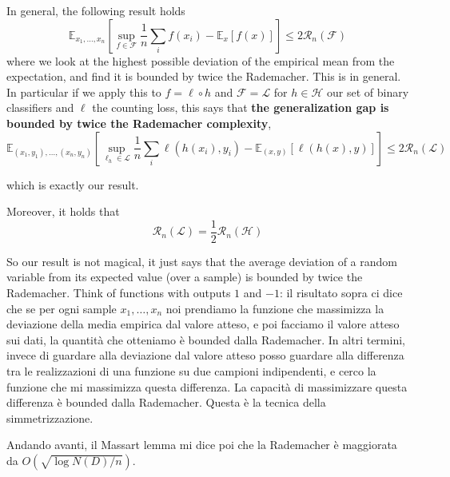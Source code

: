 \documentclass{amsart}
\begin{document}
In general, the following result holds
\[
\mathbb E_{x_1,\ldots,x_n} \left[ \sup_{f\in\mathcal F}\frac{1}{n}\sum_i f(x_i) - \mathbb E_x[f(x)]\right] \le 2 \mathcal R_n(\mathcal F)
\]
where we look at the highest possible deviation of the empirical mean from the expectation, and find it is bounded by twice the Rademacher. This is in general. In particular if we apply this to $f = \ell \circ h$ and $\mathcal F = \mathcal L$ for $h \in \mathcal H$ our set of binary classifiers and $\ell$ the counting loss, this says that {\bf the generalization gap is bounded by twice the Rademacher complexity},
\[
\mathbb E_{(x_1,y_1),\ldots,(x_n,y_n)} \left[ \sup_{\ell_h\in\mathcal L}\frac{1}{n}\sum_i \ell(h(x_i),y_i) - \mathbb E_{(x,y)}[\ell(h(x),y)]\right] \le 2 \mathcal R_n(\mathcal L)
\]

which is exactly our result.

Moreover, it holds that
\[
\mathcal R_n(\mathcal L) = \frac{1}{2} \mathcal R_n(\mathcal H)
\]

So our result is not magical, it just says that the average deviation of a random variable from its expected value (over a sample) is bounded by twice the Rademacher. Think of functions with outputs $1$ and $-1$: il risultato sopra ci dice che se per ogni sample $x_1,\ldots,x_n$ noi prendiamo la funzione che massimizza la deviazione della media empirica dal valore atteso, e poi facciamo il valore atteso sui dati, la quantità che otteniamo è bounded dalla Rademacher. In altri termini, invece di guardare alla deviazione dal valore atteso posso guardare alla differenza tra le realizzazioni di una funzione su due campioni indipendenti, e cerco la funzione che mi massimizza questa differenza. La capacità di massimizzare questa differenza è bounded dalla Rademacher. Questa è la tecnica della simmetrizzazione. 


Andando avanti, il Massart lemma mi dice poi che la Rademacher è maggiorata da $O(\sqrt{\log N(D) / n})$. 
\end{document}
